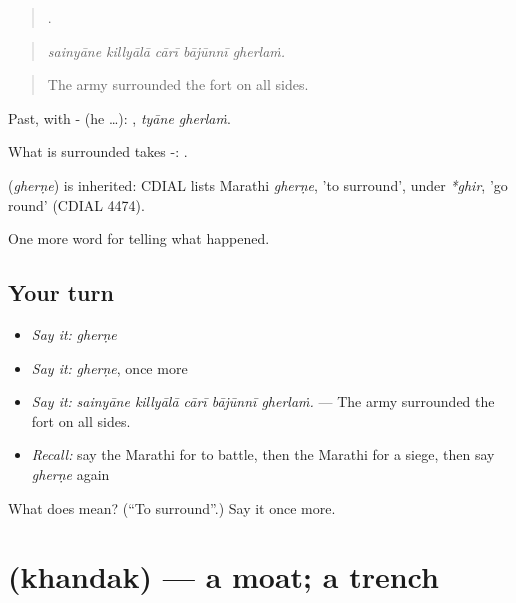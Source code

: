 \begin{quote}
    .
\end{quote}

\begin{quote}
\emph{sainyāne killyālā cārī bājūnnī gherlaṁ.}
\end{quote}

\begin{quote}
The army surrounded the fort on all sides.
\end{quote}

Past, with - (he …):  , \emph{tyāne gherlaṁ}.

What is surrounded takes -:  .

\begin{cousinweb}
\textbf{} (\emph{gherṇe}) is inherited: CDIAL lists Marathi \emph{gherṇe}, 'to surround', under \emph{*ghir}, 'go round' (CDIAL 4474).
\end{cousinweb}

\begin{grammarlens}[title={What you've built}]
One more word for telling what happened.
\end{grammarlens}

\subsection*{Your turn}
\begin{itemize}
\raggedright
  \item \emph{Say it:} \emph{gherṇe}
  \item \emph{Say it:} \emph{gherṇe}, once more
  \item \emph{Say it:} \emph{sainyāne killyālā cārī bājūnnī gherlaṁ.} — The army surrounded the fort on all sides.
  \item \emph{Recall:} say the Marathi for to battle, then the Marathi for a siege, then say \emph{gherṇe} again
\end{itemize}

\begin{tcolorbox}[breakable,colback=teal!4,colframe=teal!35!black,title={Before you move on}]
What does  mean? (\textquotedblleft{}To surround\textquotedblright{}.) Say it once more.
\end{tcolorbox}
\section[\texorpdfstring{\mr{खंदक} (khandak)}{खंदक (khandak)}]{ (khandak) — a moat; a trench}

